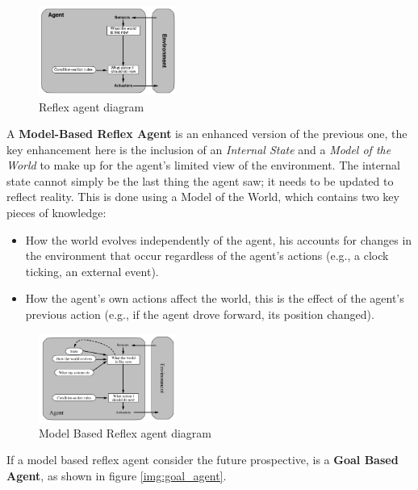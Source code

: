 \documentclass[10pt, letterpaper]{report}
\begin{document}
\begin{figure}[h!]
    \centering
    \includegraphics[width=0.4\textwidth ]{images/reflexAgent.png}
    \caption{Reflex agent diagram}
\end{figure}\bigskip

A \textbf{Model-Based Reflex Agent} is an enhanced version of the previous one, the key enhancement here is the inclusion of an \textit{Internal State} and a \textit{Model of the World} to make up for the agent's limited view of the environment. The internal state cannot simply be the last thing the agent saw; it needs to be updated to reflect reality. This is done using a Model of the World, which contains two key pieces of knowledge:\begin{itemize}
    \item 
    How the world evolves independently of the agent, his accounts for changes in the environment that occur regardless of the agent's actions (e.g., a clock ticking, an external event).
    \item
    How the agent's own actions affect the world, this is the effect of the agent's previous action (e.g., if the agent drove forward, its position changed).
\end{itemize}

\begin{figure}[h!]
    \centering
    \includegraphics[width=0.4\textwidth ]{images/ModelreflexAgent.png}
    \caption{Model Based Reflex agent diagram}
\end{figure}\bigskip

If a model based reflex agent consider the future prospective, is a \textbf{Goal Based Agent}, as shown in figure \ref{img:goal_agent}.
\end{document}
